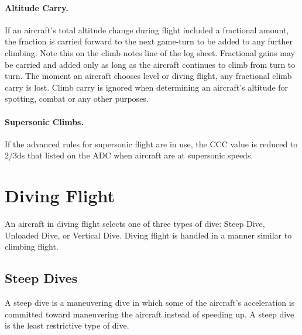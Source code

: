 \paragraph{Altitude Carry.} If an aircraft's total altitude change during flight included a fractional amount, the fraction is carried forward to the next game-turn to be added to any further climbing. Note this on the climb notes line of the log sheet. Fractional gains may be carried and added only as long as the aircraft continues to climb from turn to turn. The moment an aircraft chooses level or diving flight, any fractional climb carry is lost. Climb carry is ignored when determining an aircraft's altitude for spotting, combat or any other purposes.

\paragraph{Supersonic Climbs.} If the advanced rules for supersonic flight are in use, the CCC value is reduced to 2/3ds that listed on the ADC when aircraft are at supersonic speeds.

\section{Diving Flight}
\label{rule:diving-flight}

An aircraft in diving flight selects one of three types of dive: Steep Dive, Unloaded Dive, or Vertical Dive. Diving flight is handled in a manner similar to climbing flight. 

\subsection{Steep Dives}
\label{rule:steep-dives}

A steep dive is a maneuvering dive in which some of the aircraft's acceleration is committed toward maneuvering the aircraft instead of speeding up. A steep dive is the least restrictive type of dive.

